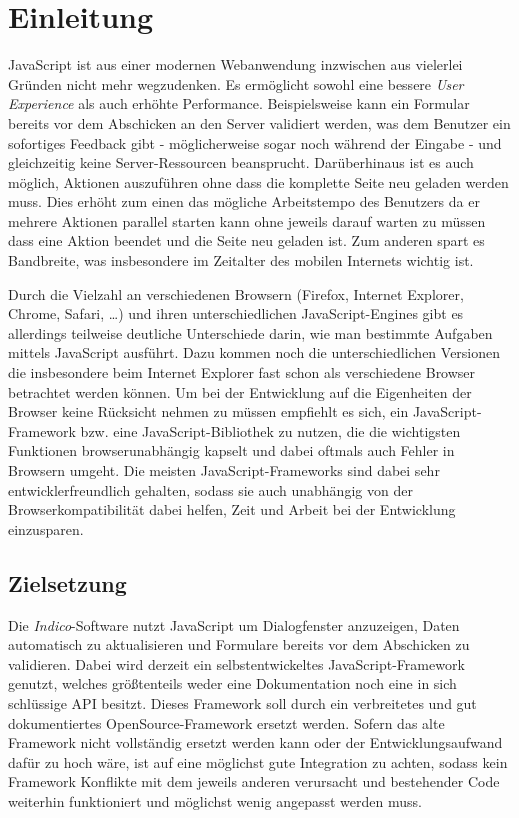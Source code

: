 \chapter{Einleitung}

JavaScript ist aus einer modernen Webanwendung inzwischen aus vielerlei Gründen nicht mehr
wegzudenken. Es ermöglicht sowohl eine bessere \emph{User Experience} als auch erhöhte Performance.
Beispielsweise kann ein Formular bereits vor dem Abschicken an den Server validiert werden, was dem
Benutzer ein sofortiges Feedback gibt - möglicherweise sogar noch während der Eingabe - und
gleichzeitig keine Server-Ressourcen beansprucht. Darüberhinaus ist es auch möglich, Aktionen
auszuführen ohne dass die komplette Seite neu geladen werden muss. Dies erhöht zum einen das
mögliche Arbeitstempo des Benutzers da er mehrere Aktionen parallel starten kann ohne jeweils darauf
warten zu müssen dass eine Aktion beendet und die Seite neu geladen ist. Zum anderen spart es
Bandbreite, was insbesondere im Zeitalter des mobilen Internets wichtig ist.

Durch die Vielzahl an verschiedenen Browsern (Firefox, Internet Explorer, Chrome, Safari, \ldots) und ihren
unterschiedlichen JavaScript-Engines gibt es allerdings teilweise deutliche Unterschiede darin, wie
man bestimmte Aufgaben mittels JavaScript ausführt. Dazu kommen noch die unterschiedlichen Versionen
die insbesondere beim Internet Explorer fast schon als verschiedene Browser betrachtet werden
können. Um bei der Entwicklung auf die Eigenheiten der Browser keine Rücksicht nehmen zu müssen
empfiehlt es sich, ein JavaScript-Framework bzw. eine JavaScript-Bibliothek zu nutzen, die die
wichtigsten Funktionen browserunabhängig kapselt und dabei oftmals auch Fehler in Browsern umgeht.
Die meisten JavaScript-Frameworks sind dabei sehr entwicklerfreundlich gehalten, sodass sie auch
unabhängig von der Browserkompatibilität dabei helfen, Zeit und Arbeit bei der Entwicklung
einzusparen.


\section{Zielsetzung}

Die \emph{Indico}-Software nutzt JavaScript um Dialogfenster anzuzeigen, Daten automatisch zu
aktualisieren und Formulare bereits vor dem Abschicken zu validieren. Dabei wird derzeit ein
selbstentwickeltes JavaScript-Framework genutzt, welches größtenteils weder eine Dokumentation
noch eine in sich schlüssige API besitzt. Dieses Framework soll durch ein verbreitetes und gut
dokumentiertes OpenSource-Framework ersetzt werden. Sofern das alte Framework nicht vollständig
ersetzt werden kann oder der Entwicklungsaufwand dafür zu hoch wäre, ist auf eine möglichst gute
Integration zu achten, sodass kein Framework Konflikte mit dem jeweils anderen verursacht und
bestehender Code weiterhin funktioniert und möglichst wenig angepasst werden muss.

